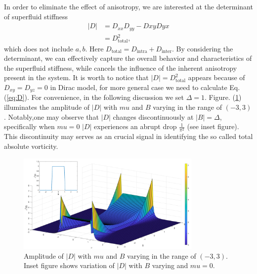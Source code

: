 \documentclass{article}
\begin{document}
In  order to eliminate the effect of anisotropy, we are interested at the determinant of superfluid stiffness 
\begin{align}
    \left\vert D \right\vert &= D_{xx}D_{yy} - D{xy}D{yx}\label{eq:D}\\
                             &= D_{\textrm{total}}^2, 
\end{align}
which does not include $ a,b $.  Here $ D_{\textrm{total}} = D_{\textrm{intra}} + D_{\textrm{inter}} $. By considering the determinant, we can effectively capture the overall behavior and characteristics of the superfluid stiffness, while cancels the influence of the inherent anisotropy present in the system. 
It is worth to notice that $ |D|=D_{\textrm{total}}^2  $ appears because of $ D_{xy}= D_{yz} = 0   $ in Dirac model, for more general case we need to calculate  Eq. (\ref{eq:D}). For convenience, in the following discussion we set $ \Delta = 1 $. Figure. (\ref{fig: Deter_D_3D}) illuminates the amplitude of $ |D| $ with $ mu $ and $ B $ varying in the range of $ \left(-3,3\right) $. Notably,one may observe that $ |D| $ changes discontinuously at $ |B| = \Delta $, specifically when $ mu=0 $ $ |D| $ experiences an abrupt drop $ \frac{1}{\pi^2} $ (see inset figure). This discontinuity may serves as an crucial signal in identifying the so called total absolute vorticity. 

\begin{figure}[H]
    \centering
    \includegraphics[width=0.8\textwidth]{matlab code/D_deter_3D_hybrid.pdf}
    \caption{Amplitude of $ |D| $ with $ mu $ and $ B $ varying in the range of $ \left(-3,3\right) $. Inset figure shows variation of $ |D| $ with $ B $ varying and $ mu =0 $. }
    \label{fig: Deter_D_3D}
\end{figure}
\end{document}
